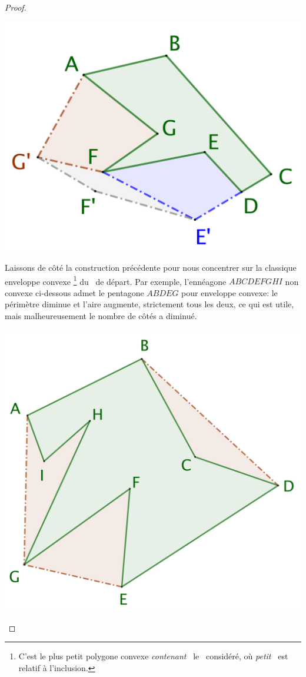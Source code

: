 \begin{proof}
	\begin{center}
		\includegraphics[scale=.4]{content/polygon/polygon-non-convex-bad.png}
	\end{center}


	Laissons de côté la construction précédente pour nous concentrer sur la classique enveloppe convexe%
	\footnote{
		C'est le plus petit polygone convexe \og \emph{contenant} \fg\ le \ngone\ considéré, où \og \emph{petit} \fg\ est relatif à l'inclusion.
	}
	du \ngone\ de départ.
	Par exemple, l'ennéagone $ABCDEFGHI$ non convexe ci-dessous admet le pentagone $ABDEG$ pour enveloppe convexe: le périmètre diminue et l'aire augmente, strictement tous les deux, ce qui est utile, mais malheureusement le nombre de côtés a diminué.
	
	\begin{center}
		\includegraphics[scale=.4]{content/polygon/polygon-convex-hull.png}
	\end{center}


\end{proof}
